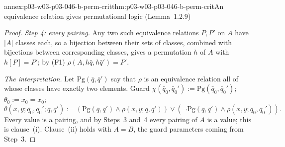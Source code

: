 \begin{annexitem}{annex:p03-w03-p03-046-b-perm-crit}{thm:p03-w03-p03-046-b-perm-crit}{An equivalence relation gives permutational logic (Lemma~1.2.9)}
\begin{proof}
\emph{Step 4: every pairing.} Any two such equivalence relations \(P,P'\)
on \(A\) have \(|A|\) classes each, so a bijection between their sets of
classes, combined with bijections between corresponding classes, gives a
permutation \(h\) of \(A\) with \(h[P]=P'\); by (F1)
\(\rho(A,h\bar q,h\bar q')=P'\).

\emph{The interpretation.} Let \(\mathrm{Pg}(\bar q,\bar q')\) say that
\(\rho\) is an equivalence relation all of whose classes have exactly two
elements. Guard \(\chi(\bar q_0,\bar q_0'):=\mathrm{Pg}(\bar q_0,\bar
q_0')\); \(\theta_0:=x_0=x_0\);
\[
\theta(x,y;\bar q_0,\bar q_0';\bar q,\bar q'):=
(\mathrm{Pg}(\bar q,\bar q')\wedge\rho(x,y;\bar q,\bar q'))\vee
(\neg\mathrm{Pg}(\bar q,\bar q')\wedge\rho(x,y;\bar q_0,\bar q_0')).
\]
Every value is a pairing, and by Steps~3 and~4 every pairing of \(A\) is a
value; this is clause~(i). Clause~(ii) holds with \(A=B\), the guard
parameters coming from Step~3.
\end{proof}
\end{annexitem}

